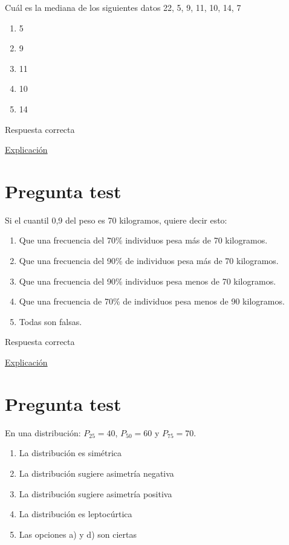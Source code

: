 \documentclass[
]{book}
\providecommand{\tightlist}{%
  \setlength{\itemsep}{0pt}\setlength{\parskip}{0pt}}
\begin{document}
Cuál es la mediana de los siguientes datos 22, 5, 9, 11, 10, 14, 7

\begin{enumerate}
\def\labelenumi{\alph{enumi})}
\tightlist
\item
  5
\item
  9
\item
  11
\item
  10
\item
  14
\end{enumerate}

Respuesta correcta

\href{https://1fjmanzano.github.io/bioestadistica/medidas-de-posicio\%CC\%81n-dispersio\%CC\%81n-y-forma.html\#medidas-de-posicio\%CC\%81n-centrales}{Explicación}

\hypertarget{pregunta-test-90}{%
\section{Pregunta test}\label{pregunta-test-90}}

Si el cuantil 0,9 del peso es 70 kilogramos, quiere decir esto:

\begin{enumerate}
\def\labelenumi{\alph{enumi})}
\tightlist
\item
  Que una frecuencia del 70\% individuos pesa más de 70 kilogramos.
\item
  Que una frecuencia del 90\% de individuos pesa más de 70 kilogramos.
\item
  Que una frecuencia del 90\% individuos pesa menos de 70 kilogramos.
\item
  Que una frecuencia de 70\% de individuos pesa menos de 90 kilogramos.
\item
  Todas son falsas.
\end{enumerate}

Respuesta correcta

\href{https://1fjmanzano.github.io/bioestadistica/medidas-de-posicio\%CC\%81n-dispersio\%CC\%81n-y-forma.html\#medidas-de-posicio\%CC\%81n-centrales}{Explicación}

\hypertarget{pregunta-test-91}{%
\section{Pregunta test}\label{pregunta-test-91}}

En una distribución: \(P_{25} = 40\), \(P_{50} =60\) y \(P_{75} =70\).

\begin{enumerate}
\def\labelenumi{\alph{enumi})}
\tightlist
\item
  La distribución es simétrica
\item
  La distribución sugiere asimetría negativa
\item
  La distribución sugiere asimetría positiva
\item
  La distribución es leptocúrtica
\item
  Las opciones a) y d) son ciertas
\end{enumerate}
\end{document}
